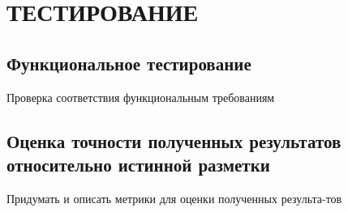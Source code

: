 \newpage
\section{ТЕСТИРОВАНИЕ}
\label{sec:Experiments}

\subsection{Функциональное тестирование}
Проверка соответствия функциональным требованиям
\vspace{2em}

\subsection{Оценка точности полученных результатов относительно истинной разметки}
Придумать и описать метрики для оценки полученных результа-тов